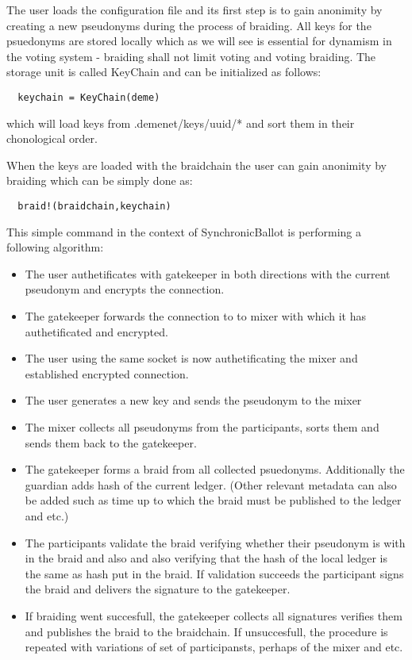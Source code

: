 \documentclass{article}
\begin{document}
The user loads the configuration file and its first step is to gain anonimity by creating a new pseudonyms during the process of braiding. All keys for the psuedonyms are stored locally which as we will see is essential for dynamism in the voting system - braiding shall not limit voting and voting braiding. The storage unit is called KeyChain and can be initialized as follows:
\begin{lstlisting}
  keychain = KeyChain(deme)
\end{lstlisting}
which will load keys from .demenet/keys/uuid/* and sort them in their chonological order.

When the keys are loaded with the braidchain the user can gain anonimity by braiding which can be simply done as:
\begin{lstlisting}
  braid!(braidchain,keychain)
\end{lstlisting}
This simple command in the context of SynchronicBallot is performing a following algorithm:
\begin{itemize}
\item The user authetificates with gatekeeper in both directions with the current pseudonym and encrypts the connection.
\item The gatekeeper forwards the connection to to mixer with which it has authetificated and encrypted.
\item The user using the same socket is now authetificating the mixer and established encrypted connection.
\item The user generates a new key and sends the pseudonym to the mixer
\item The mixer collects all pseudonyms from the participants, sorts them and sends them back to the gatekeeper.
\item The gatekeeper forms a braid from all collected psuedonyms. Additionally the guardian adds hash of the current ledger. (Other relevant metadata can also be added such as time up to which the braid must be published to the ledger and etc.)
\item The participants validate the braid verifying whether their pseudonym is with in the braid and also and also verifying that the hash of the local ledger is the same as hash put in the braid. If validation succeeds the participant signs the braid and delivers the signature to the gatekeeper.
\item If braiding went succesfull, the gatekeeper collects all signatures verifies them and publishes the braid to the braidchain. If unsuccesfull, the procedure is repeated with variations of set of participansts, perhaps of the mixer and etc.
\end{itemize}
\end{document}
